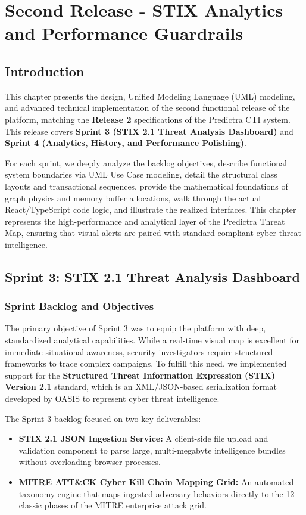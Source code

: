 \chapter{Second Release - STIX Analytics and Performance Guardrails}

\section{Introduction}
This chapter presents the design, Unified Modeling Language (UML) modeling, and advanced technical implementation of the second functional release of the platform, matching the \textbf{Release 2} specifications of the Predictra CTI system. This release covers \textbf{Sprint 3 (STIX 2.1 Threat Analysis Dashboard)} and \textbf{Sprint 4 (Analytics, History, and Performance Polishing)}. 

For each sprint, we deeply analyze the backlog objectives, describe functional system boundaries via UML Use Case modeling, detail the structural class layouts and transactional sequences, provide the mathematical foundations of graph physics and memory buffer allocations, walk through the actual React/TypeScript code logic, and illustrate the realized interfaces. This chapter represents the high-performance and analytical layer of the Predictra Threat Map, ensuring that visual alerts are paired with standard-compliant cyber threat intelligence.

\section{Sprint 3: STIX 2.1 Threat Analysis Dashboard}

\subsection{Sprint Backlog and Objectives}
The primary objective of Sprint 3 was to equip the platform with deep, standardized analytical capabilities. While a real-time visual map is excellent for immediate situational awareness, security investigators require structured frameworks to trace complex campaigns. To fulfill this need, we implemented support for the \textbf{Structured Threat Information Expression (STIX) Version 2.1} standard, which is an XML/JSON-based serialization format developed by OASIS to represent cyber threat intelligence.

The Sprint 3 backlog focused on two key deliverables:
\begin{itemize}
    \item \textbf{STIX 2.1 JSON Ingestion Service:} A client-side file upload and validation component to parse large, multi-megabyte intelligence bundles without overloading browser processes.
    \item \textbf{MITRE ATT\&CK Cyber Kill Chain Mapping Grid:} An automated taxonomy engine that maps ingested adversary behaviors directly to the 12 classic phases of the MITRE enterprise attack grid.
\end{itemize}

